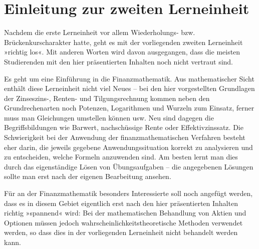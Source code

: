 \chapter*{Einleitung zur zweiten Lerneinheit}

Nachdem die erste Lerneinheit vor allem Wiederholungs- bzw. Brückenkurscharakter hatte, geht es mit der vorliegenden zweiten Lerneinheit »richtig los«. Mit anderen Worten wird davon ausgegangen, dass die meisten Studierenden mit den hier präsentierten Inhalten noch nicht vertraut sind.

Es geht um eine Einführung in die Finanzmathematik. Aus mathematischer Sicht enthält diese Lerneinheit nicht viel Neues -- bei den hier vorgestellten Grundlagen der Zinseszins-, Renten- und Tilgungsrechnung kommen neben den Grundrechenarten noch Potenzen, Logarithmen und Wurzeln zum Einsatz, ferner muss man Gleichungen umstellen können usw. Neu sind dagegen die Begriffsbildungen wie Barwert, nachschüssige Rente oder Effektivzinssatz. Die Schwierigkeit bei der Anwendung der finanzmathematischen Verfahren besteht eher darin, die jeweils gegebene Anwendungssituation korrekt zu analysieren und zu entscheiden, welche Formeln anzuwenden sind. Am besten lernt man dies durch das eigenständige Lösen von Übungsaufgaben -- die angegebenen Lösungen sollte man erst nach der eigenen Bearbeitung ansehen.

Für an der Finanzmathematik besonders Interessierte soll noch angefügt werden, dass es in diesem Gebiet eigentlich erst nach den hier präsentierten Inhalten richtig »spannend« wird: Bei der mathematischen Behandlung von Aktien und Optionen müssen jedoch wahrscheinlichkeitstheoretische Methoden verwendet werden, so dass dies in der vorliegenden Lerneinheit nicht behandelt werden kann.
